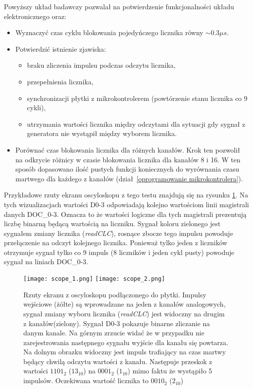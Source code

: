 Powyższy układ badawczy pozwalał na potwierdzenie funkcjonalności układu elektronicznego oraz:
\begin{itemize}
        \item Wyznaczyć czas cyklu blokowania pojedyńczego licznika równy $\sim 0.3\mu s$.
        \item Potwierdzić istnienie zjawiska:
        \begin{itemize}
                \item braku zliczenia impulsu podczas odczytu licznika,
                \item przepełnienia licznika,
                \item synchronizacji płytki z mikrokontrolerem (powtórzenie stanu licznika co 9 cykli), 
                \item utrzymania wartości licznika między odczytami dla sytuacji gdy sygnał z generatora nie wystąpił między wyborem licznika.
        \end{itemize}  
        \item Porównać czas blokowania licznika dla różnych kanałów. Krok ten pozwolił na odkrycie różnicy w czasie blokowania licznika dla kanałów 8 i 16. W ten sposób dopasowano ilość pustych funkcji koniecznych do wyrównania czasu martwego dla każdego z kanałów (dział~\ref{oprogramowanie mikrokontrolera}).
\end{itemize} 

Przykładowe rzuty ekranu oscyloskopu z tego testu znajdują się na rysunku \ref{Oscyloskop}. Na tych wizualizacjach wartości D0-3 odpowiadają kolejno wartościom linii magistrali danych DOC\_0-3. Oznacza to że wartości logiczne dla tych magistrali prezentują liczbę binarną będącą wartością na liczniku. Sygnał koloru zielonego jest sygnałem zmiany licznika (\textit{readCLC}), rosnące zbocze tego impulsu powoduje przełączenie na odczyt kolejnego licznika. Ponieważ tylko jeden z liczników otrzymuje sygnał tylko co 9 impuls (8 liczników i jeden cykl pusty) powoduje sygnał na liniach DOC\_0-3.

\begin{figure}
        \texttt{[image: scope\_1.png]}
        \texttt{[image: scope\_2.png]}
        \caption{Rzuty ekranu z oscyloskopu podłączonego do płytki. 
        Impulsy wejściowe (żółte) są wprowadzane na jeden z kanałów analogowych, sygnał zmiany wyboru licznika (\textit{readCLC}) jest widoczny na drugim z kanałów(zielony). 
        Sygnał D0-3 pokazuje binarne zliczanie na danym kanale. 
        Na górnym zrzucie widać że w przypadku nie zarejestrowania następnego sygnału wyjście dla kanału się powtarza. 
        Na dolnym obrazku widoczny jest impuls trafiający na czas martwy będący chwilą odczytu wartości z kanału.
        Następuje przeskok z wartości $1101_{2}$ ($13_{10}$) na $0001_{2}$ ($1_{10}$) mimo faktu że wystąpiło 5 impulsów. Oczekiwana wartość licznika to $0010_2$ ($2_{10}$)
        }
        \label{Oscyloskop}
\end{figure}

